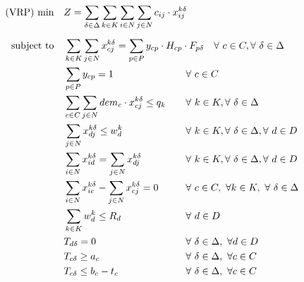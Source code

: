 \documentclass[preprint,review,12pt]{elsarticle}
\begin{document}
\begin{align}
	\text{(VRP) min} \quad      & Z = \sum\limits_{\delta\in \Delta} \sum\limits_{k\in K}\sum\limits_{i\in N}\sum\limits_{j\in N} c_{ij} \cdot x_{ij}^{k\delta}    && \label{PCVRP_FObj}    \\[5pt]
	\noindent \text{subject to} \quad & \sum\limits_{k \in K}\sum\limits_{j \in N} x_{cj}^{k\delta} = \sum\limits_{p \in P} y_{cp} \cdot H_{cp} \cdot  F_{p\delta}     && \text{\hspace{-0cm}} \forall \ c \in C, \forall \ \delta \in \Delta \label{PCVRP_Service} \\
	& \sum\limits_{p \in P} y_{cp} = 1                 && \text{\hspace{-1cm}} \forall \ c \in C  \label{PCVRP_Freq} \\
	& \sum\limits_{c \in C}\sum\limits_{j \in N}dem_{c} \cdot x_{cj}^{k\delta} \leq q_k                 && \text{\hspace{-1cm}} \forall \ k \in K, \forall \ \delta \in \Delta  \label{PCVRP_Capacity} \\
	& \sum\limits_{j \in N}x_{dj}^{k\delta} \leq w_d^k && \text{\hspace{-1cm}} \forall \ k \in K, \forall \ \delta \in \Delta, \forall \ d \in D \label{PCVRP_StartRoute} \\
	& \sum\limits_{i \in N}x_{id}^{k\delta} =    \sum\limits_{j \in N}x_{dj}^{k\delta} && \text{\hspace{-1cm}} \forall \ k \in K, \forall \ \delta \in \Delta, \forall \ d \in D \label{PCVRP_EndRoute} \\
	& \sum\limits_{i \in N}x_{ic}^{k\delta} - \sum\limits_{j \in N}x_{cj}^{k\delta} = 0             && \text{\hspace{-1cm}} \forall \ c \in C,\ \forall k \in K,\ \forall \ \delta \in \Delta \label{PCVRP_Balance} \\
	& \sum\limits_{k \in K}w_d^k \leq R_d                                     && \text{\hspace{-1cm}} \forall \ d \in D \label{PCVRP_CapacityD} \\
	& T_{d\delta} = 0  && \text{\hspace{-1cm}} \forall \ \delta \in \Delta, \ \forall d \in D \label{PCVRP_InitialT}\\
	& T_{c\delta} \geq a_c  && \text{\hspace{-1cm}} \forall \ \delta \in \Delta, \ \forall c \in C \label{PCVRP_ArriveT}\\
	& T_{c\delta} \leq b_c - t_c && \text{\hspace{-1cm}} \forall \ \delta \in \Delta, \ \forall c \in C \label{PCVRP_DepartT}
\end{align}
\end{document}
